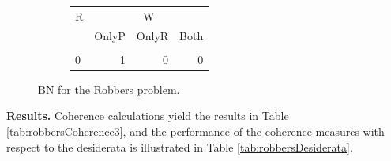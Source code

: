 \documentclass[
  10pt,
]{scrartcl}
\begin{document}
\begin{figure}[H]
\begin{subfigure}[!ht]{0.4\textwidth}
\begin{tabular}{lrrr}
\toprule
\multicolumn{1}{c}{R} & \multicolumn{3}{c}{W} \\
  & OnlyP & OnlyR & Both\\
\midrule
\cellcolor{gray!6}{1} & \cellcolor{gray!6}{0} & \cellcolor{gray!6}{1} & \cellcolor{gray!6}{1}\\
0 & 1 & 0 & 0\\
\bottomrule
\end{tabular}


\endgroup{}


\end{subfigure}
\caption{BN for the \textsf{Robbers} problem.}
\label{fig:Robbers}
\end{figure}

\textbf{Results.} Coherence calculations yield the results in Table \ref{tab:robbersCoherence3}, and the performance of the coherence measures with respect to the desiderata is illustrated in Table \ref{tab:robbersDesiderata}.

\begin{table}[H]

\caption{\label{tab:robbersCoherence3}Coherence scores in the Robbers scenario (rounded).}
\centering
{}
\end{table}

\begin{table}[H]

\caption{\label{tab:robbersDesiderata}Desiderata satisfaction in the Robbers problem.}
\centering
{}
\end{table}
\end{document}
